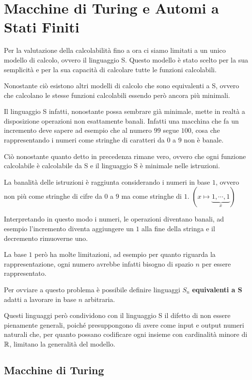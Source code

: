 \chapter{Macchine di Turing e Automi a Stati Finiti}

Per la valutazione della calcolabilità fino a ora ci siamo limitati a un unico modello di calcolo, ovvero il linguaggio S. Questo modello è stato scelto per la sua semplicità e per la sua capacità di calcolare tutte le funzioni calcolabili.

Nonostante ciò esistono altri modelli di calcolo che sono equivalenti a S, ovvero che calcolano le stesse funzioni calcolabili essendo però ancora più minimali.

Il linguaggio S infatti, nonostante possa sembrare già minimale, mette in realtà a disposizione operazioni non esattamente banali. Infatti una macchina che fa un incremento deve sapere ad esempio che al numero \(99\) segue \(100\), cosa che rappresentando i numeri come stringhe di caratteri da \(0\) a \(9\) non è banale.

Ciò nonostante quanto detto in precedenza rimane vero, ovvero che ogni funzione calcolabile è calcolabile da S e il linguaggio S è minimale nelle istruzioni.

La banalità delle istruzioni è raggiunta considerando i numeri in base \(1\), ovvero non più come stringhe di cifre da \(0\) a \(9\) ma come stringhe di \(1\).
\((x \mapsto \underbrace{1, \cdots , 1}_x )\)

Interpretando in questo modo i numeri, le operazioni diventano banali, ad esempio l'incremento diventa aggiungere un \(1\) alla fine della stringa e il decremento rimuoverne uno.

La base \(1\) però ha molte limitazioni, ad esempio per quanto riguarda la rappresentazione, ogni numero avrebbe infatti bisogno di spazio \(n\) per essere rappresentato.

Per ovviare a questo problema è possibile definire linguaggi \(S_n\) \textbf{equivalenti a S} adatti a lavorare in base \(n\) arbitraria.

Questi linguaggi però condividono con il linguaggio S il difetto di non essere pienamente generali, poiché presuppongono di avere come input e output numeri naturali che, per quanto possano codificare ogni insieme con cardinalità minore di \(\mathbb{R}\), limitano la generalità del modello.

\section{Macchine di Turing}

